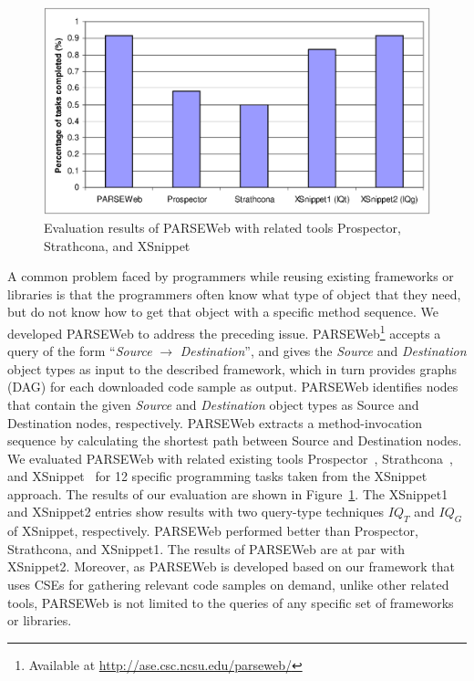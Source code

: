\begin{figure}[t]
\centering
\includegraphics[scale=0.50,clip]{ComparisonResults1.eps}
\caption{Evaluation results of PARSEWeb with related tools Prospector, Strathcona, and XSnippet} \label{fig:comparison}
\vspace*{-2ex}
\end{figure}
A common problem faced by programmers while reusing existing
frameworks or libraries is that the programmers often know what type
of object that they need, but do not know how to get that object
with a specific method sequence. We developed PARSEWeb to address
the preceding issue. PARSEWeb\footnote{Available at
\url{http://ase.csc.ncsu.edu/parseweb/}} accepts a query of the form
``\emph{Source} $\rightarrow$ \emph{Destination}'', and gives the
\emph{Source} and \emph{Destination} object types as input to the
described framework, which in turn provides graphs (DAG) for each
downloaded code sample as output. PARSEWeb identifies nodes that
contain the given \emph{Source} and \emph{Destination} object types
as Source and Destination nodes, respectively. PARSEWeb extracts a
method-invocation sequence by calculating the shortest path between
Source and Destination nodes. We evaluated PARSEWeb with related
existing tools Prospector~\cite{prospector:jungloid},
Strathcona~\cite{strathcona:se}, and XSnippet~\cite{xsnippet:saha}
for 12 specific programming tasks taken from the XSnippet approach.
The results of our evaluation are shown in
Figure~\ref{fig:comparison}. The XSnippet1 and XSnippet2 entries
show results with two query-type techniques $IQ_{T}$ and $IQ_{G}$ of
XSnippet, respectively. PARSEWeb performed better than Prospector,
Strathcona, and XSnippet1. The results of PARSEWeb are at par with
XSnippet2. Moreover, as PARSEWeb is developed based on our framework
that uses CSEs for gathering relevant code samples on demand, unlike
other related tools, PARSEWeb is not limited to the queries of any
specific set of frameworks or libraries. 

